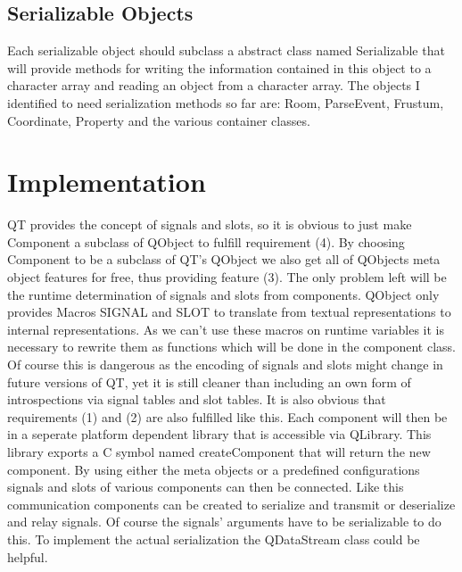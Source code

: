 \documentclass[11pt]{article}
\begin{document}
\subsection{Serializable Objects}
Each serializable object should subclass a abstract class named Serializable
that will provide methods for writing the information contained in this object
to a character array and reading an object from a character array. The objects
I identified to need serialization methods so far are: Room, ParseEvent, 
Frustum, Coordinate, Property and the various container classes.

\section{Implementation}
QT provides the concept of signals and slots, so it is obvious to just
make Component a subclass of QObject to fulfill requirement (4).
By choosing Component to be a subclass of QT's QObject we also get all of 
QObjects meta object features for free, thus providing feature (3). The only 
problem left will be the runtime determination of signals and slots from 
components. QObject only provides Macros SIGNAL and SLOT to translate from 
textual representations to internal representations. As we can't use these 
macros on runtime variables it is necessary to rewrite them as functions which 
will be done in the component class. Of course this is dangerous as the encoding
of signals and slots might change in future versions of QT, yet it is still
cleaner than including an own form of introspections via signal tables and slot
tables. It is also obvious that requirements (1) and (2) are also fulfilled
like this. Each component will then be in a seperate platform dependent 
library that is accessible via QLibrary. This library exports a C symbol named
createComponent that will return the new component. By using either the  meta 
objects or a predefined configurations signals and slots of various components 
can then be connected. Like this communication components can be created to
serialize and transmit or deserialize and relay signals. Of course the signals'
arguments have to be serializable to do this. To implement the actual 
serialization the QDataStream class could be helpful.
\end{document}
